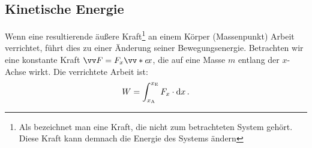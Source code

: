 \subsection{Kinetische Energie}\label{subsec: kinetische_energie}
Wenn eine resultierende äußere Kraft\footnote{Als  bezeichnet man eine Kraft, die nicht zum betrachteten System gehört. Diese Kraft kann demnach die Energie des Systems ändern} an einem Körper (Massenpunkt) Arbeit verrichtet, führt dies zu einer Änderung seiner Bewegungsenergie. Betrachten wir eine konstante Kraft $\ivec{F} = F_x \ivecS{e}{x}$, die auf eine Masse $m$ entlang der $x$-Achse wirkt. Die verrichtete Arbeit ist:
\begin{equation}\label{eq: arbeit_integration_entlang_x}
    W = \int_{x_\text{A}}^{x_\text{E}} F_x \cdot \mathrm{d} x \,.
\end{equation}
